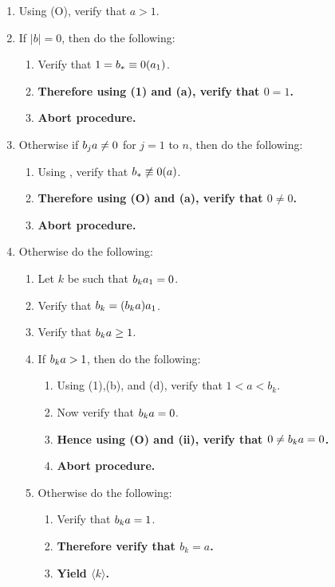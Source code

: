 \documentclass[twocolumn]{article}
\let\div\relax
\DeclareMathOperator{\div}{div}
\let\mod\relax
\DeclareMathOperator{\mod}{mod}
\newcommand{\procedurehr}[2][]{\hyperref[sec:procedure #2]{\ifthenelse{\equal{#1}{}}{procedure #2}{#1}}}
\begin{document}
				\begin{enumerate}
					\item Using (O), verify that $a>1$.
					\item If $\lvert b\rvert=0$, then do the following:
					\begin{enumerate}
						\item Verify that $1=b_*\equiv 0(\mod a_1)$.
						\item \textbf{Therefore using (1) and (a), verify that $0=1$.}
						\item \textbf{Abort procedure.}
					\end{enumerate}
					\item Otherwise if $b_j\mod a\ne 0$ for $j=1$ to $n$, then do the following:
					\begin{enumerate}
						\item Using \procedurehr{1.23}, verify that $b_*\not\equiv 0 (\mod a)$.
						\item \textbf{Therefore using (O) and (a), verify that $0\ne 0$.}
						\item \textbf{Abort procedure.}
					\end{enumerate}
					\item Otherwise do the following:
					\begin{enumerate}
						\item Let $k$ be such that $b_k\mod a_1=0$.
						\item Verify that $b_k=(b_k\div a)a_1$.
						\item Verify that $b_k\div a\ge 1$.
						\item If $b_k\div a>1$, then do the following:
						\begin{enumerate}
							\item Using (1),(b), and (d), verify that $1<a<b_k$.
							\item Now verify that $b_k\mod a=0$.
							\item \textbf{Hence using (O) and (ii), verify that $0\ne b_k\mod a=0$.}
							\item \textbf{Abort procedure.}
						\end{enumerate}
						\item Otherwise do the following:
						\begin{enumerate}
							\item Verify that $b_k\div a=1$.
							\item \textbf{Therefore verify that $b_k=a$.}
							\item \textbf{Yield $\langle k\rangle$.}
						\end{enumerate}
					\end{enumerate}
				\end{enumerate}
\end{document}
